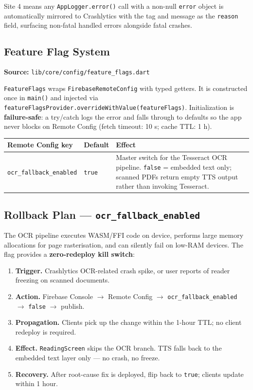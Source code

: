 \documentclass[11pt,a4paper]{article}
\begin{document}
Site 4 means any \texttt{AppLogger.error()} call with a non-null \texttt{error} object
is automatically mirrored to Crashlytics with the tag and message as the \texttt{reason}
field, surfacing non-fatal handled errors alongside fatal crashes.

\subsection{Feature Flag System}

\textbf{Source:} \texttt{lib/core/config/feature\_flags.dart}

\texttt{FeatureFlags} wraps \texttt{FirebaseRemoteConfig} with typed getters. It is
constructed once in \texttt{main()} and injected via
\texttt{featureFlagsProvider.overrideWithValue(featureFlags)}.
Initialization is \textbf{failure-safe}: a try/catch logs the error and falls through to
defaults so the app never blocks on Remote Config (fetch timeout: 10 s; cache TTL: 1 h).

\vspace{4pt}
\begin{tabularx}{\textwidth}{@{}L{4.2cm} C{1.8cm} L{7.8cm}@{}}
  \toprule
  \textbf{Remote Config key} & \textbf{Default} & \textbf{Effect} \\
  \midrule
  \texttt{ocr\_fallback\_enabled} & \texttt{true} &
    Master switch for the Tesseract OCR pipeline. \texttt{false} = embedded text only;
    scanned PDFs return empty TTS output rather than invoking Tesseract. \\
  \bottomrule
\end{tabularx}

\subsection{Rollback Plan — \texttt{ocr\_fallback\_enabled}}

The OCR pipeline executes WASM/FFI code on device, performs large memory allocations
for page rasterisation, and can silently fail on low-RAM devices. The flag provides a
\textbf{zero-redeploy kill switch}:

\begin{enumerate}
  \item \textbf{Trigger.} Crashlytics OCR-related crash spike, or user reports of reader
    freezing on scanned documents.
  \item \textbf{Action.} Firebase Console $\rightarrow$ Remote Config $\rightarrow$
    \texttt{ocr\_fallback\_enabled} $\rightarrow$ \texttt{false} $\rightarrow$ publish.
  \item \textbf{Propagation.} Clients pick up the change within the 1-hour TTL; no
    client redeploy is required.
  \item \textbf{Effect.} \texttt{ReadingScreen} skips the OCR branch. TTS falls back to
    the embedded text layer only — no crash, no freeze.
  \item \textbf{Recovery.} After root-cause fix is deployed, flip back to \texttt{true};
    clients update within 1 hour.
\end{enumerate}
\end{document}
